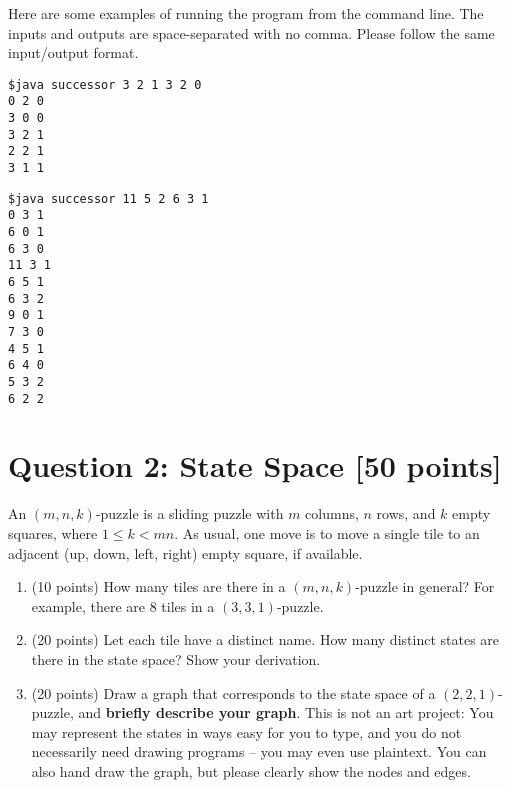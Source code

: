 \documentclass{article}
\begin{document}
Here are some examples of running the program from the command line.
The inputs and outputs are space-separated with no comma.
Please follow the same input/output format.

\begin{verbatim}
$java successor 3 2 1 3 2 0
0 2 0
3 0 0
3 2 1
2 2 1
3 1 1
\end{verbatim}

\begin{verbatim}
$java successor 11 5 2 6 3 1
0 3 1
6 0 1
6 3 0
11 3 1
6 5 1
6 3 2
9 0 1
7 3 0
4 5 1
6 4 0
5 3 2
6 2 2
\end{verbatim}
\newpage

\section*{Question 2: State Space [50 points]}
An $(m, n, k)$-puzzle is a sliding puzzle with $m$ columns, $n$ rows, and $k$ empty squares, where $1 \le k < mn$.  As usual, one move is to move a single tile to an adjacent (up, down, left, right) empty square, if available.

\begin{enumerate}
\item (10 points) How many tiles are there in a $(m, n, k)$-puzzle in general?  For example, there are 8 tiles in a $(3, 3, 1)$-puzzle.

\item (20 points) Let each tile have a distinct name. How many distinct states are there in the state space?  Show your derivation.

\item (20 points) Draw a graph that corresponds to the state space of a $(2,2,1)$-puzzle, and \textbf{briefly describe your graph}.  
This is not an art project: 
You may represent the states in ways easy for you to type, and you do not necessarily need drawing programs -- you may even use plaintext.
You can also hand draw the graph, but please clearly show the nodes and edges.  

\end{enumerate}
\end{document}
